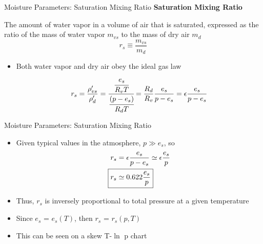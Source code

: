 
\begin{frame}{Moisture Parameters: Saturation Mixing Ratio}
\textbf{Saturation Mixing Ratio}
\begin{fancydefs}
	The amount of water vapor in a volume of air that is saturated, expressed as the ratio of the mass of water vapor $m_{vs}$ to the mass of dry air $m_d$
	$$r_s \equiv \frac{m_{vs}}{m_d}$$
\end{fancydefs}
\begin{itemize}
	\item Both water vapor and dry air obey the ideal gas law
	$$r_s = \frac{\rho^\prime_{vs}}{\rho^\prime_{d}} = \cfrac{\cfrac{e_s}{R_vT}}{\cfrac{(p-e_s)}{R_dT}} = \frac{R_d}{R_v}\frac{e_s}{p-e_s}=\epsilon\frac{e_s}{p-e_s}$$
\end{itemize}
\end{frame}


\begin{frame}{Moisture Parameters: Saturation Mixing Ratio}
\begin{itemize}
	\item Given typical values in the atmosphere, $p\gg e_s$, so
	\begin{align*}
		r_s &=\epsilon\frac{e_s}{p-e_s} \simeq \epsilon\frac{e_s}{p}\\
		\Aboxed{r_s &\simeq 0.622\frac{e_s}{p}}
	\end{align*}
	
\item Thus, $r_s$ is inversely proportional to total pressure at a given temperature
\item Since $e_s$ = $e_s(T)$, then $r_s$ = $r_s(p,T)$
\item This can be seen on a skew T-$\ln$ p chart
\end{itemize}
\end{frame}


